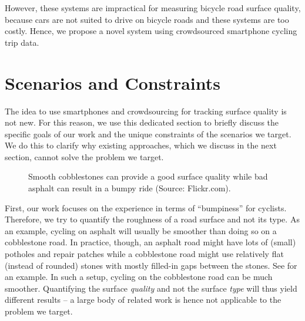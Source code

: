 However, these systems are impractical for measuring bicycle road surface quality, because cars are not suited to drive on bicycle roads and these systems are too costly.
Hence, we propose a novel system using crowdsourced smartphone cycling trip data.

\section{Scenarios and Constraints}
\label{sec:scenarios_and_constraints}
The idea to use smartphones and crowdsourcing for tracking surface quality is not new.
For this reason, we use this dedicated section to briefly discuss the specific goals of our work and the unique constraints of the scenarios we target.
We do this to clarify why existing approaches, which we discuss in the next section, cannot solve the problem we target.

\begin{figure}[t]
    \centering
    \hfill
    \caption{%
        Smooth cobblestones can provide a good surface quality while bad asphalt can result in a bumpy ride (Source: Flickr.com).
    }%
    \label{fig:cobblestone_vs_asphalt}
\end{figure}

First, our work focuses on the experience in terms of ``bumpiness'' for cyclists.
Therefore, we try to quantify the roughness of a road surface and not its type.
As an example, cycling on asphalt will usually be smoother than doing so on a cobblestone road.
In practice, though, an asphalt road might have lots of (small) potholes and repair patches while a cobblestone road might use relatively flat (instead of rounded) stones  with mostly filled-in gaps between the stones.
See  for an example.
In such a setup, cycling on the cobblestone road can be much smoother.
Quantifying the surface \emph{quality} and not the surface \emph{type} will thus yield different results -- a large body of related work is hence not applicable to the problem we target.

